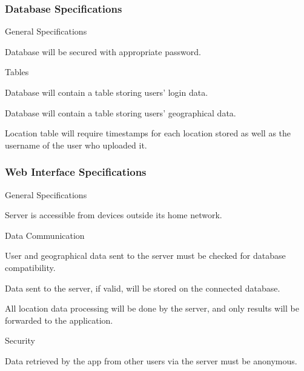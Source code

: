 \subsubsection{Database Specifications}

\begin{SA}
    \item General Specifications
    \begin{SA}
        \item Database will be secured with appropriate password.
    \end{SA}
    \item Tables
    \begin{SA}
        \item Database will contain a table storing users' login data.
        \item Database will contain a table storing users' geographical data.
        \item Location table will require timestamps for each location stored as well as the username of the user who uploaded it.
    \end{SA}
\end{SA}

\subsubsection{Web Interface Specifications}

\begin{SA}
    \item General Specifications
    \begin{SA}
        \item Server is accessible from devices outside its home network.
    \end{SA}
    \item Data Communication
    \begin{SA}
        \item User and geographical data sent to the server must be checked for database compatibility.
        \item Data sent to the server, if valid, will be stored on the connected database.
        \item All location data processing will be done by the server, and only results will be forwarded to the application.
    \end{SA}
    \item Security
    \begin{SA}
        \item Data retrieved by the app from other users via the server must be anonymous.
    \end{SA}
\end{SA}
